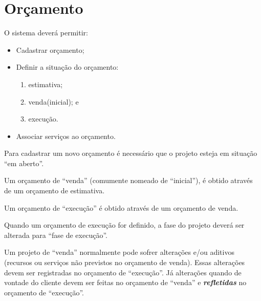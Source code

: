 \chapter{Orçamento}

O sistema deverá permitir:

\begin{itemize}
	\item Cadastrar orçamento;
	\item Definir a situação do orçamento:
	\begin{enumerate}
		\item estimativa;
		\item venda(inicial); e
		\item execução.
	\end{enumerate}
	\item Associar serviços ao orçamento.
\end{itemize}

Para cadastrar um novo orçamento é necessário que o projeto esteja em situação ``em aberto''.

Um orçamento de ``venda'' (comumente nomeado de ``inicial''), é obtido através de um orçamento de estimativa. 

Um orçamento de ``execução'' é obtido através de um orçamento de venda.

Quando um orçamento de execução for definido, a fase do projeto deverá ser alterada para ``fase de execução''.

Um projeto de ``venda'' normalmente pode sofrer alterações e/ou aditivos (recursos ou serviços não previstos no orçamento de venda). Essas alterações devem ser registradas no orçamento de ``execução''. Já alterações quando de vontade do cliente devem ser feitas no orçamento de ``venda'' e \emph{\textbf{refletidas}} no orçamento de ``execução''.